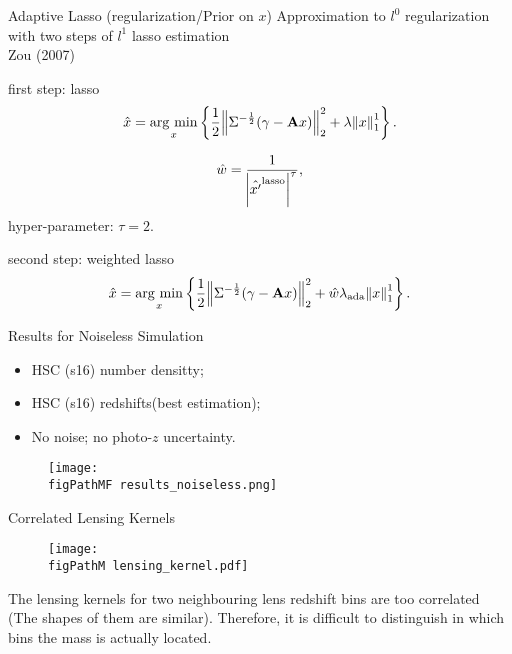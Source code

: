 \begin{frame}{Adaptive Lasso (regularization/Prior on $x$)}
\alert{Approximation to $l^0$ regularization with two steps of
$l^1$ lasso estimation}\\
Zou (2007)
\begin{alertblock}{first step: lasso}
\begin{equation}\notag
\hat{x}=\mathop{\rm arg~min}\limits_{x} \left\{ \frac{1}{2} \norm{\Sigma^{-\frac{1}{2}}(\gamma-\mathbf{A}x)}^2_2 +
\lambda \norm{x}^1_1\right\}.
\end{equation}
\end{alertblock}
\begin{equation}
\hat{w}= \frac{1}{\abs{\hat{x'}^{\rm{lasso}}}^\tau},
\end{equation}
hyper-parameter: $\tau=2$.
\begin{alertblock}{second step: weighted lasso}
\begin{equation}\notag
\hat{x}=\mathop{\rm arg~min}\limits_{x} \left\{ \frac{1}{2} \norm{\Sigma^{-\frac{1}{2}}(\gamma-\mathbf{A}x)}^2_2 +
\hat{w}\lambda_{\rm{ada}} \norm{x}^1_1\right\}.
\end{equation}
\end{alertblock}
\end{frame}


\begin{frame}{Results for Noiseless Simulation}
\begin{itemize}
    \item HSC (s16) number densitty;
    \item HSC (s16) redshifts(best estimation);
    \item No noise; no photo-$z$ uncertainty.
\end{itemize}
\begin{figure}
\centering
\texttt{[image: \\figPathMF results\_noiseless.png]}
\end{figure}
\end{frame}


\begin{frame}{Correlated Lensing Kernels}
\begin{figure}
 \centering
 \texttt{[image: \\figPathM lensing\_kernel.pdf]}
\end{figure}
\alert{The lensing kernels for two neighbouring lens redshift bins
are too correlated (The shapes of them are similar). Therefore, it
is difficult to distinguish in which bins the mass is actually
located.}
\end{frame}


